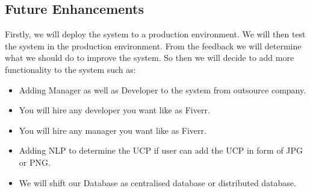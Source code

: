 \subsection{Future Enhancements}
Firstly, we will deploy the system to a production environment.
We will then test the system in the production environment.
From the feedback we will determine what we should do to improve the system.
So then we will decide to add more functionality to the system such as:
\begin{itemize}
    \item Adding Manager as well as Developer to the system from outsource company.
    \item You will hire any developer you want like as Fiverr.
    \item You will hire any manager you want like as Fiverr.
    \item Adding NLP to determine the UCP if user can add the UCP in form of JPG or PNG.
    \item We will shift our Database as centralised database or distributed database.
\end{itemize}
